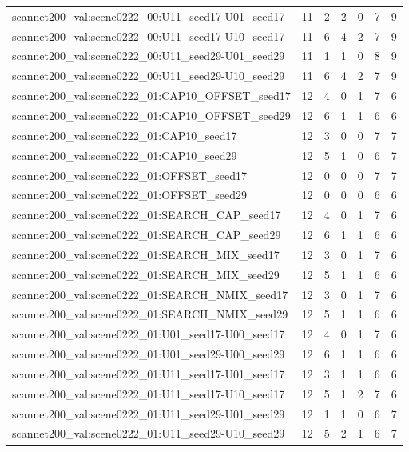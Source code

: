 \begin{table}[t]
\begin{tabular}{lrrrrrr}
scannet200\_val:scene0222\_00:U11\_seed17-U01\_seed17 & 11 & 2 & 2 & 0 & 7 & 9 \\
scannet200\_val:scene0222\_00:U11\_seed17-U10\_seed17 & 11 & 6 & 4 & 2 & 7 & 9 \\
scannet200\_val:scene0222\_00:U11\_seed29-U01\_seed29 & 11 & 1 & 1 & 0 & 8 & 9 \\
scannet200\_val:scene0222\_00:U11\_seed29-U10\_seed29 & 11 & 6 & 4 & 2 & 7 & 9 \\
scannet200\_val:scene0222\_01:CAP10\_OFFSET\_seed17 & 12 & 4 & 0 & 1 & 7 & 6 \\
scannet200\_val:scene0222\_01:CAP10\_OFFSET\_seed29 & 12 & 6 & 1 & 1 & 6 & 6 \\
scannet200\_val:scene0222\_01:CAP10\_seed17 & 12 & 3 & 0 & 0 & 7 & 7 \\
scannet200\_val:scene0222\_01:CAP10\_seed29 & 12 & 5 & 1 & 0 & 6 & 7 \\
scannet200\_val:scene0222\_01:OFFSET\_seed17 & 12 & 0 & 0 & 0 & 7 & 7 \\
scannet200\_val:scene0222\_01:OFFSET\_seed29 & 12 & 0 & 0 & 0 & 6 & 6 \\
scannet200\_val:scene0222\_01:SEARCH\_CAP\_seed17 & 12 & 4 & 0 & 1 & 7 & 6 \\
scannet200\_val:scene0222\_01:SEARCH\_CAP\_seed29 & 12 & 6 & 1 & 1 & 6 & 6 \\
scannet200\_val:scene0222\_01:SEARCH\_MIX\_seed17 & 12 & 3 & 0 & 1 & 7 & 6 \\
scannet200\_val:scene0222\_01:SEARCH\_MIX\_seed29 & 12 & 5 & 1 & 1 & 6 & 6 \\
scannet200\_val:scene0222\_01:SEARCH\_NMIX\_seed17 & 12 & 3 & 0 & 1 & 7 & 6 \\
scannet200\_val:scene0222\_01:SEARCH\_NMIX\_seed29 & 12 & 5 & 1 & 1 & 6 & 6 \\
scannet200\_val:scene0222\_01:U01\_seed17-U00\_seed17 & 12 & 4 & 0 & 1 & 7 & 6 \\
scannet200\_val:scene0222\_01:U01\_seed29-U00\_seed29 & 12 & 6 & 1 & 1 & 6 & 6 \\
scannet200\_val:scene0222\_01:U11\_seed17-U01\_seed17 & 12 & 3 & 1 & 1 & 6 & 6 \\
scannet200\_val:scene0222\_01:U11\_seed17-U10\_seed17 & 12 & 5 & 1 & 2 & 7 & 6 \\
scannet200\_val:scene0222\_01:U11\_seed29-U01\_seed29 & 12 & 1 & 1 & 0 & 6 & 7 \\
scannet200\_val:scene0222\_01:U11\_seed29-U10\_seed29 & 12 & 5 & 2 & 1 & 6 & 7 \\

\end{tabular}
\end{table}
